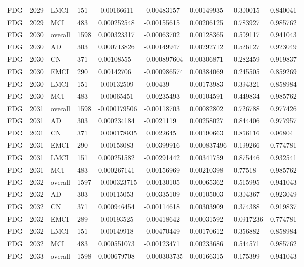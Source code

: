 \begin{landscape}
\begin{longtable}{lllllllll}
FDG & 2029 & LMCI & 151 & -0.00166611 & -0.00483157 & 0.00149935 & 0.300015 & 0.840041 \\
FDG & 2029 & MCI & 483 & 0.000252548 & -0.00155615 & 0.00206125 & 0.783927 & 0.985762 \\
FDG & 2030 & overall & 1598 & 0.000323317 & -0.00063702 & 0.00128365 & 0.509117 & 0.941043 \\
FDG & 2030 & AD & 303 & 0.000713826 & -0.00149947 & 0.00292712 & 0.526127 & 0.923049 \\
FDG & 2030 & CN & 371 & 0.00108555 & -0.000897604 & 0.00306871 & 0.282459 & 0.919837 \\
FDG & 2030 & EMCI & 290 & 0.00142706 & -0.000986574 & 0.00384069 & 0.245505 & 0.859269 \\
FDG & 2030 & LMCI & 151 & -0.00132509 & -0.00439 & 0.00173983 & 0.394321 & 0.858984 \\
FDG & 2030 & MCI & 483 & -0.00065451 & -0.00235493 & 0.00104591 & 0.449834 & 0.985762 \\
FDG & 2031 & overall & 1598 & -0.000179506 & -0.00118703 & 0.00082802 & 0.726788 & 0.977426 \\
FDG & 2031 & AD & 303 & 0.000234184 & -0.0021119 & 0.00258027 & 0.844406 & 0.977957 \\
FDG & 2031 & CN & 371 & -0.000178935 & -0.0022645 & 0.00190663 & 0.866116 & 0.96804 \\
FDG & 2031 & EMCI & 290 & -0.00158083 & -0.00399916 & 0.000837496 & 0.199266 & 0.774781 \\
FDG & 2031 & LMCI & 151 & 0.000251582 & -0.00291442 & 0.00341759 & 0.875446 & 0.932541 \\
FDG & 2031 & MCI & 483 & 0.000267141 & -0.00156969 & 0.00210398 & 0.77518 & 0.985762 \\
FDG & 2032 & overall & 1597 & -0.000323715 & -0.00130105 & 0.00065362 & 0.515995 & 0.941043 \\
FDG & 2032 & AD & 303 & -0.00115053 & -0.00335109 & 0.00105003 & 0.304367 & 0.923049 \\
FDG & 2032 & CN & 371 & 0.000946454 & -0.00114618 & 0.00303909 & 0.374388 & 0.919837 \\
FDG & 2032 & EMCI & 289 & -0.00193525 & -0.00418642 & 0.00031592 & 0.0917236 & 0.774781 \\
FDG & 2032 & LMCI & 151 & -0.00149918 & -0.00470449 & 0.00170612 & 0.356882 & 0.858984 \\
FDG & 2032 & MCI & 483 & 0.000551073 & -0.00123471 & 0.00233686 & 0.544571 & 0.985762 \\
FDG & 2033 & overall & 1598 & 0.000679708 & -0.000303735 & 0.00166315 & 0.175399 & 0.941043 \\

\end{longtable}
\end{landscape}
